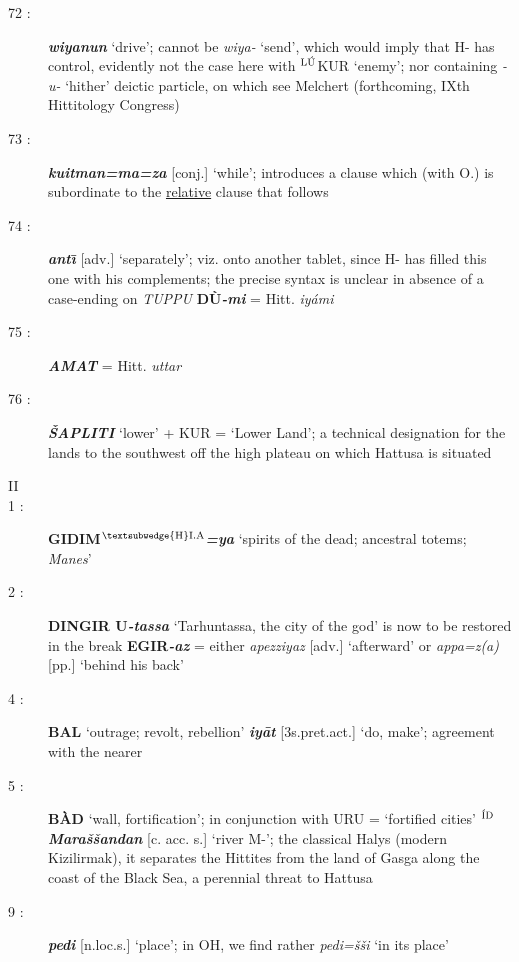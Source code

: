 \documentclass[10pt]{article}
\newcommand{\supersc}[1]{$^{\textrm{\scriptsize{#1}}}$}  	%
\newcommand{\bit}[1]{\textbf{\textit{#1}}}				%
\newcommand{\p}[1]{{\tiny[{#1}]}}					%
\newcommand{\I}{\={\i}}									%
\newcommand{\hith}{\textsubwedge{h}}
\newcommand{\Hith}{\textsubwedge{H}}
\newcommand{\hpl}{\supersc{{\Hith}I.A}}
\renewcommand{\.}[1]{\textsubdot{#1}}
\begin{document}
\begin{description}
\item[72 :] \bit{wiyanun} `drive'; cannot be \textit{wiya-} `send', which would imply that H- has control, evidently not the case here with \supersc{L\'U}KUR `enemy'; nor containing \textit{-u-} `hither' deictic particle, on which see Melchert (forthcoming, IXth Hittitology Congress)

\item[73 :] \bit{kuitman=ma=za} \p{conj.} `while'; introduces a clause which (with O.) is subordinate to the \underline{relative} clause that follows

\item[74 :] \bit{{\hith}ant\I} \p{adv.} `separately'; viz. onto another tablet, since H- has filled this one with his complements; the precise syntax is unclear in absence of a case-ending on \textit{TUPPU} \textbf{D\`U}\bit{-mi} = Hitt. \textit{iy\'ami}

\item[75 :] \bit{AMAT} = Hitt. \textit{uttar}

\item[76 :] \bit{\v{S}APLITI} `lower' + KUR = `Lower Land'; a technical designation for the lands to the southwest off the high plateau on which Hattusa is situated

\smallskip
\item[II]
\smallskip

\item[1 :] \textbf{GIDIM\hpl}\bit{=ya} `spirits of the dead; ancestral totems; \textit{Manes}'

\item[2 :] \textbf{DINGIR U}\bit{-tassa} `Tarhuntassa, the city of the god' is now to be restored in the break {\bf EGIR}\bit{-az} = either \textit{apezziyaz} \p{adv.} `afterward' or \textit{appa=z(a)} \p{pp.} `behind his back'

\item[4 :] \textbf{BAL} `outrage; revolt, rebellion' \bit{iy\=at} \p{3s.pret.act.} `do, make'; agreement with the nearer

\item[5 :] \textbf{B\`AD} `wall, fortification'; in conjunction with URU = `fortified cities' \textbf{\supersc{\'ID}}\bit{Mara\v{s}\v{s}andan} \p{c. acc. s.} `river M-'; the classical Halys (modern Kizilirmak), it  separates the Hittites from the land of Gasga along the coast of the Black Sea, a perennial threat to Hattusa

\item[9 :] \bit{pedi} \p{n.loc.s.} `place'; in OH, we find rather \textit{pedi=\v{s}\v{s}i} `in its place' 


\end{description}
\end{document}
